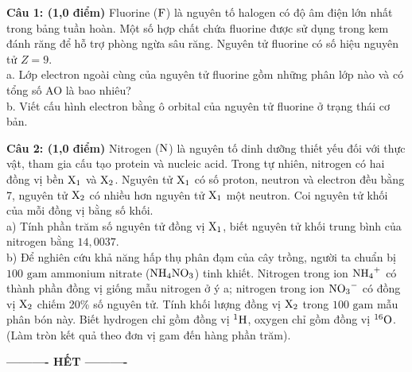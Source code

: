 \documentclass[11pt,a4paper]{article}
\begin{document}
\noindent
\textbf{Câu 1: (1,0 điểm)} Fluorine ($\ce{F}$) là nguyên tố halogen có độ âm điện lớn nhất trong bảng tuần hoàn. Một số hợp chất chứa fluorine được sử dụng trong kem đánh răng để hỗ trợ phòng ngừa sâu răng. Nguyên tử fluorine có số hiệu nguyên tử $Z = 9$.\\
a. Lớp electron ngoài cùng của nguyên tử fluorine gồm những phân lớp nào và có tổng số AO là bao nhiêu?\\
b. Viết cấu hình electron bằng ô orbital của nguyên tử fluorine ở trạng thái cơ bản.

\vspace{1pt}
\noindent
{}

\vspace{4pt}
\noindent
\textbf{Câu 2: (1,0 điểm)} Nitrogen ($\ce{N}$) là nguyên tố dinh dưỡng thiết yếu đối với thực vật, tham gia cấu tạo protein và nucleic acid. Trong tự nhiên, nitrogen có hai đồng vị bền $\ce{X_1}$ và $\ce{X_2}$. Nguyên tử $\ce{X_1}$ có số proton, neutron và electron đều bằng 7, nguyên tử $\ce{X_2}$ có nhiều hơn nguyên tử $\ce{X_1}$ một neutron. Coi nguyên tử khối của mỗi đồng vị bằng số khối.\\
a) Tính phần trăm số nguyên tử đồng vị $\ce{X_1}$, biết nguyên tử khối trung bình của nitrogen bằng $14,0037$.\\
b) Để nghiên cứu khả năng hấp thụ phân đạm của cây trồng, người ta chuẩn bị $100\text{ gam}$ ammonium nitrate ($\ce{NH4NO3}$) tinh khiết. Nitrogen trong ion $\ce{NH4^+}$ có thành phần đồng vị giống mẫu nitrogen ở ý a; nitrogen trong ion $\ce{NO3^-}$ có đồng vị $\ce{X_2}$ chiếm 20\% số nguyên tử. Tính khối lượng đồng vị $\ce{X_2}$ trong $100\text{ gam}$ mẫu phân bón này. Biết hydrogen chỉ gồm đồng vị $^1\ce{H}$, oxygen chỉ gồm đồng vị $^{16}\ce{O}$. (Làm tròn kết quả theo đơn vị gam đến hàng phần trăm).

\vspace{1pt}
\noindent
{}

\vspace{6pt}
\begin{center}
\textbf{\large ---------- HẾT ----------}
\end{center}
\end{document}
